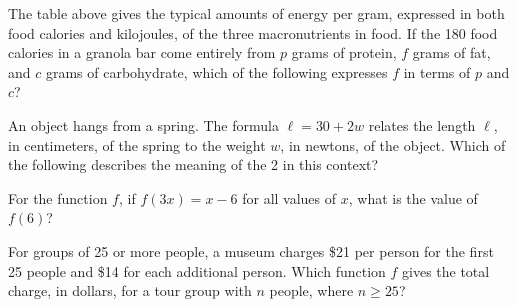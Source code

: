 The table above gives the typical amounts of energy per gram, expressed in both food calories and kilojoules, of the three macronutrients in food. If the 180 food calories in a granola bar come entirely from \( p \) grams of protein, \( f \) grams of fat, and \( c \) grams of carbohydrate, which of the following expresses \( f \) in terms of \( p \) and \( c \)?

\vspace{0.75em}


\vspace{2em}
\newpage
\noindent\markforreview

\vspace{1em}

An object hangs from a spring. The formula \( \ell = 30 + 2w \) relates the length \( \ell \), in centimeters, of the spring to the weight \( w \), in newtons, of the object. Which of the following describes the meaning of the 2 in this context?

\vspace{0.75em}



\vspace{2em}
\noindent\markforreview

\vspace{1em}

For the function \( f \), if \( f(3x) = x - 6 \) for all values of \( x \), what is the value of \( f(6) \)?

\vspace{0.75em}




\newpage
\noindent\markforreview

\vspace{1em}

For groups of 25 or more people, a museum charges \$21 per person for the first 25 people and \$14 for each additional person. Which function \( f \) gives the total charge, in dollars, for a tour group with \( n \) people, where \( n \geq 25 \)?

\vspace{0.75em}



\newpage


